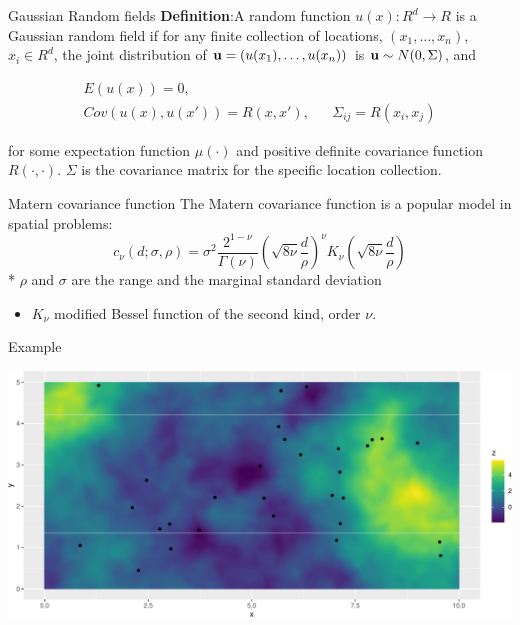 \documentclass[
  ignorenonframetext,
]{beamer}
\providecommand{\tightlist}{%
  \setlength{\itemsep}{0pt}\setlength{\parskip}{0pt}}
\begin{document}
\begin{frame}{Gaussian Random fields}
\protect\hypertarget{gaussian-random-fields}{}
\textbf{Definition}:A random function \(u(x):R^d\rightarrow R\) is a
Gaussian random field if for any finite collection of locations,
\((x_1,\dots, x_n)\), \(x_i\in R^d\), the joint distribution of
\({\bf u} = (u(x_1),\dots, u(x_n))\) is \({\bf u} \sim N(0, \Sigma)\),
and

\[
\begin{aligned}
E(u(x)) = 0, &\\ 
Cov(u(x), u(x')) = R(x, x'), && \Sigma_{ij} = R(x_i, x_j)
\end{aligned}
\]

for some expectation function \(\mu(\cdot)\) and positive definite
covariance function \(R(\cdot, \cdot)\). \(\Sigma\) is the covariance
matrix for the specific location collection.
\end{frame}

\begin{frame}{Matern covariance function}
\protect\hypertarget{matern-covariance-function}{}
The Matern covariance function is a popular model in spatial problems:
\[
c_{\nu}(d;\sigma,\rho) = \sigma^2\frac{2^{1-\nu}}{\Gamma(\nu)}\left(\sqrt{8\nu}\frac{d}{\rho}\right)^{\nu}K_{\nu}\left(\sqrt{8\nu}\frac{d}{\rho}\right)
\] * \(\rho\) and \(\sigma\) are the range and the marginal standard
deviation

\begin{itemize}
\tightlist
\item
  \(K_{\nu}\) modified Bessel function of the second kind, order
  \(\nu\).
\end{itemize}
\end{frame}

\begin{frame}{Example}
\protect\hypertarget{example}{}
\begin{center}\includegraphics[width=0.6\linewidth]{Part3_Spatial_files/figure-beamer/unnamed-chunk-6-1} \end{center}
\end{frame}
\end{document}
